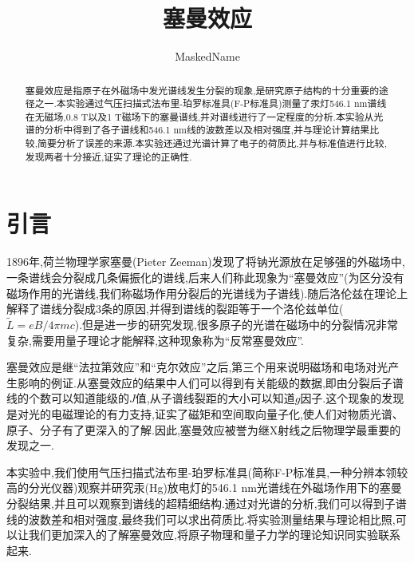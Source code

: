 \documentclass[font=default]{mpltx}
\begin{document}
\title{塞曼效应} %
\author{MaskedName} %
\date{}
\begin{abstract}
塞曼效应是指原子在外磁场中发光谱线发生分裂的现象,是研究原子结构的十分重要的途径之一.本实验通过气压扫描式法布里-珀罗标准具(F-P标准具)测量了汞灯546.1 nm谱线在无磁场,0.8 T以及1 T磁场下的塞曼谱线,并对谱线进行了一定程度的分析.本实验从光谱的分析中得到了各子谱线和546.1 nm线的波数差以及相对强度,并与理论计算结果比较,简要分析了误差的来源.本实验还通过光谱计算了电子的荷质比,并与标准值进行比较,发现两者十分接近,证实了理论的正确性.
\end{abstract}

\maketitle

\section{引言}
1896年,荷兰物理学家塞曼(Pieter Zeeman)发现了将钠光源放在足够强的外磁场中,一条谱线会分裂成几条偏振化的谱线,后来人们称此现象为``塞曼效应''(为区分没有磁场作用的光谱线,我们称磁场作用分裂后的光谱线为子谱线).随后洛伦兹在理论上解释了谱线分裂成3条的原因,并得到谱线的裂距等于一个洛伦兹单位($\widetilde{L}=eB/4\pi mc$).但是进一步的研究发现,很多原子的光谱在磁场中的分裂情况非常复杂,需要用量子理论才能解释,这种现象称为``反常塞曼效应''.

塞曼效应是继``法拉第效应''和``克尔效应''之后,第三个用来说明磁场和电场对光产生影响的例证.从塞曼效应的结果中人们可以得到有关能级的数据,即由分裂后子谱线的个数可以知道能级的$J$值,从子谱线裂距的大小可以知道$g$因子.这个现象的发现是对光的电磁理论的有力支持,证实了磁矩和空间取向量子化,使人们对物质光谱、原子、分子有了更深入的了解.因此,塞曼效应被誉为继X射线之后物理学最重要的发现之一.

本实验中,我们使用气压扫描式法布里-珀罗标准具(简称F-P标准具,一种分辨本领较高的分光仪器)观察并研究汞(Hg)放电灯的546.1 nm光谱线在外磁场作用下的塞曼分裂结果,并且可以观察到谱线的超精细结构.通过对光谱的分析,我们可以得到子谱线的波数差和相对强度,最终我们可以求出荷质比.将实验测量结果与理论相比照,可以让我们更加深入的了解塞曼效应,将原子物理和量子力学的理论知识同实验联系起来.
\end{document}
